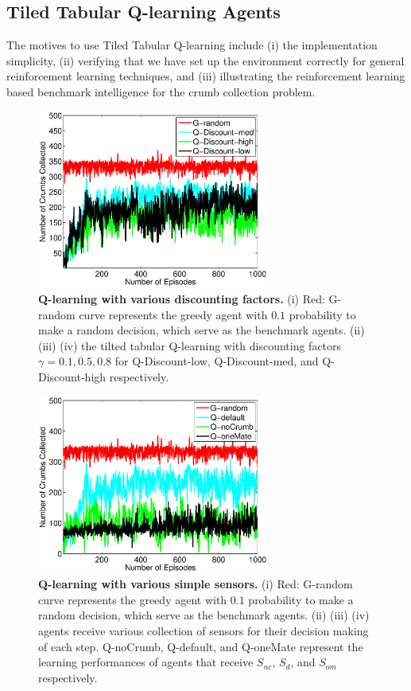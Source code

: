 \documentclass[conference]{IEEEtran}
\begin{document}
\subsection{Tiled Tabular Q-learning Agents}
The motives to use Tiled Tabular Q-learning include
(i) the implementation simplicity,
(ii) verifying that we have set up the environment correctly for general
reinforcement learning techniques, and 
(iii) illustrating the reinforcement learning based benchmark intelligence
for the crumb collection problem.

\begin{figure}[!t]
\centering
\includegraphics[width=3.0in]{./figures/RL/init_setup2.eps}
\caption{\textbf{Q-learning with various discounting factors.} (i) Red: G-random curve
    represents the greedy agent with $0.1$ probability to make a random
    decision, which serve as the benchmark agents. 
    (ii) (iii) (iv) the tilted tabular Q-learning with discounting factors
    $\gamma = 0.1, 0.5, 0.8$ for Q-Discount-low, Q-Discount-med, and
    Q-Discount-high respectively.}
\label{fig:RL_init2}
\end{figure}

\begin{figure}[!t]
\centering
\includegraphics[width=3.0in]{./figures/RL/init_setup1.eps}
\caption{\textbf{Q-learning with various simple sensors.} (i) Red: G-random curve
    represents the greedy agent with $0.1$ probability to make a random
    decision, which serve as the benchmark agents. 
    (ii) (iii) (iv) agents receive various collection of sensors for their
    decision making of each step. Q-noCrumb, Q-default, and Q-oneMate
    represent the learning performances of agents that receive $S_{nc}$,
    $S_{d}$, and $S_{om}$ respectively.
} 
\label{fig:RL_init}
\end{figure}
\end{document}
